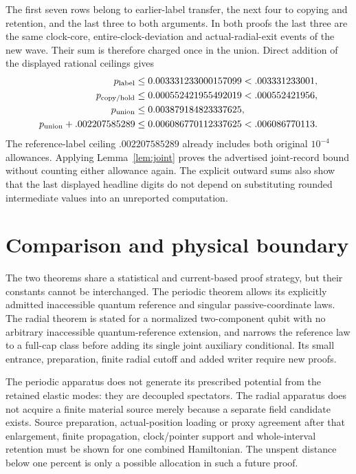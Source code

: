 \documentclass[11pt]{article}
\theoremstyle{definition}\newtheorem{definition}[theorem]{Definition}
\theoremstyle{remark}\newtheorem{remark}[theorem]{Remark}
\begin{document}
The first seven rows belong to earlier-label transfer, the next four to
copying and retention, and the last three to both arguments. In both
proofs the last three are the same clock-core, entire-clock-deviation
and actual-radial-exit events of the new wave. Their sum is therefore
charged once in the union. Direct addition of the displayed rational
ceilings gives
\[
\begin{aligned}
 p_{\rm label}&\le 0.003331233000157099<.003331233001,\\
 p_{\rm copy/hold}&\le 0.000552421955492019<.000552421956,\\
 p_{\rm union}&\le 0.003879184823337625,\\
 p_{\rm union}+.002207585289&\le 0.006086770112337625<.006086770113.
\end{aligned}
\]
The reference-label ceiling $.002207585289$ already includes both
original $10^{-4}$ allowances. Applying Lemma~\ref{lem:joint} proves
the advertised joint-record bound without counting either allowance
again. The explicit outward sums also show that the last displayed
headline digits do not depend on substituting rounded intermediate
values into an unreported computation.

\section{Comparison and physical boundary}
The two theorems share a statistical and current-based proof strategy,
but their constants cannot be interchanged. The periodic theorem allows
its explicitly admitted inaccessible quantum reference and singular
passive-coordinate laws. The radial theorem is stated for a normalized
two-component qubit with no arbitrary inaccessible quantum-reference
extension, and narrows the reference law to a full-cap class before
adding its single joint auxiliary conditional. Its small entrance,
preparation, finite radial cutoff and added writer require new proofs.

The periodic apparatus does not generate its prescribed potential from
the retained elastic modes: they are decoupled spectators. The radial
apparatus does not acquire a finite material source merely because a
separate field candidate exists. Source preparation, actual-position
loading or proxy agreement after that enlargement, finite propagation,
clock/pointer support and whole-interval retention must be shown for one
combined Hamiltonian. The unspent distance below one percent is only a
possible allocation in such a future proof.
\end{document}
